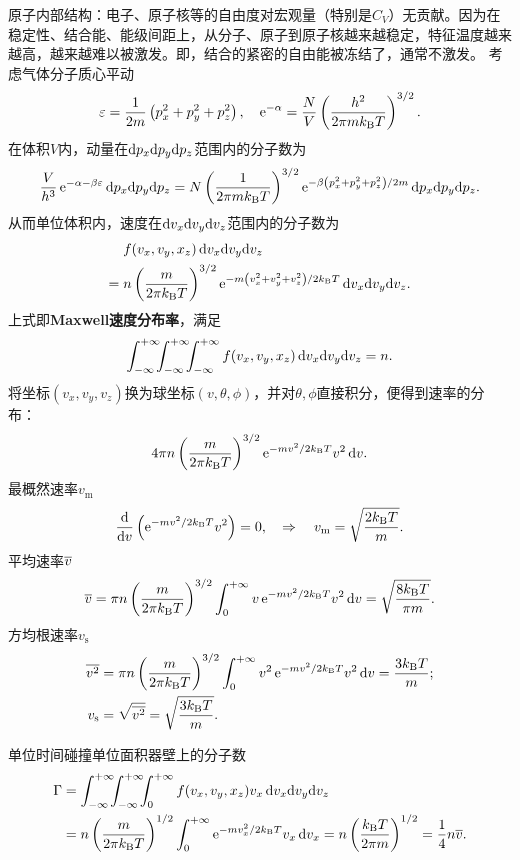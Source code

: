 原子内部结构：电子、原子核等的自由度对宏观量（特别是$C_V$）无贡献。因为在稳定性、结合能、能级间距上，从分子、原子到原子核越来越稳定，特征温度越来越高，越来越难以被激发。即，结合的紧密的自由能被冻结了，通常不激发。
考虑气体分子质心平动
\[
	\varepsilon=\frac1{2m}\kh{p_x^2+p_y^2+p_z^2},\quad \e{-\alpha}=\frac NV\kh{\frac{h^2}{2\pi m\kB T}}^{3/2}.
\]
在体积$V$内，动量在$\d p_x\nd p_y\nd p_z$范围内的分子数为
\[
	\frac V{h^3}\e{-\alpha-\beta\varepsilon}\d p_x\nd p_y\nd p_z=N\kh{\frac1{2\pi m\kB T}}^{3/2}\e{-\beta\kh{p_x^2+p_y^2+p_z^2}/2m}\d p_x\nd p_y\nd p_z.
\]
从而单位体积内，速度在$\d v_x\nd v_y\nd v_z$范围内的分子数为
\begin{align}
	\begin{aligned}
		&f(v_x,v_y,x_z)\d v_x\nd v_y\nd v_z\\
		=\;&n\kh{\frac m{2\pi\kB T}}^{3/2}\e{-m\kh{v_x^2+v_y^2+v_z^2}/2\kB T}\d v_x\nd v_y\nd v_z.
	\end{aligned}
\end{align}
上式即\textbf{Maxwell速度分布率}，满足
\[
	\int\iti\bs5\int\iti\bs5\int\iti f(v_x,v_y,x_z)\d v_x\nd v_y\nd v_z=n.
\]
将坐标$(v_x,v_y,v_z)$换为球坐标$(v,\theta,\phi)$，并对$\theta,\phi$直接积分，便得到速率的分布：
\begin{align}
	4\pi n\kh{\frac m{2\pi\kB T}}^{3/2}\e{-mv^2/2\kB T}v^2\d v.
\end{align}
最概然速率$v_\mathrm m$
\begin{gather}
	\dd v\kh{\e{-mv^2/2\kB T}v^2}=0,\thus
	v_\mathrm m=\sqrt{\frac{2\kB T}m}.
\end{gather}
平均速率$\avg v$
\begin{align}
	\avg v=\pi n\kh{\frac m{2\pi\kB T}}^{3/2}\int\zti v\e{-mv^2/2\kB T}v^2\d v=\sqrt{\frac{8\kB T}{\pi m}}.
\end{align}
方均根速率$v_\mathrm s$
\begin{align}\notag
	\avg{v^2}&=\pi n\kh{\frac m{2\pi\kB T}}^{3/2}\int\zti v^2\e{-mv^2/2\kB T}v^2\d v=\frac{3\kB T}m;\\
	v_\mathrm s&=\sqrt{\avg{v^2}}=\sqrt{\frac{3\kB T}m}.
\end{align}

单位时间碰撞单位面积器壁上的分子数
\begin{align}\notag
	\Gamma&=\int\iti\bs5\int\iti\bs5\int\zti f(v_x,v_y,x_z) v_x\d v_x\nd v_y\nd v_z\\
	&=n\kh{\frac m{2\pi\kB T}}^{1/2}\int\zti\e{-mv_x^2/2\kB T}v_x\d v_x=n\kh{\frac{\kB T}{2\pi m}}^{1/2}=\frac14n\avg v.
\end{align}
